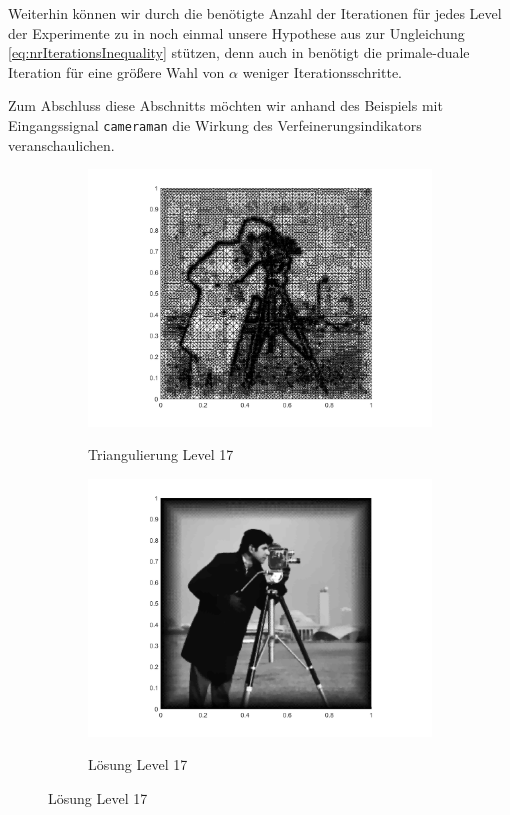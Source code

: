 Weiterhin können wir durch die benötigte Anzahl der Iterationen für jedes Level
der Experimente zu  in
 noch einmal unsere Hypothese aus 
 zur Ungleichung \eqref{eq:nrIterationsInequality}
stützen, denn auch in  benötigt die
primale-duale Iteration für eine größere Wahl von $\alpha$ weniger
Iterationsschritte.

Zum Abschluss diese Abschnitts möchten wir anhand des Beispiels mit
Eingangssignal \texttt{cameraman} die Wirkung des Verfeinerungsindikators
veranschaulichen.
\begin{figure}[p]
  \centering
  \begin{subfigure}[b]{.39\linewidth}
    \centering
    \caption{Triangulierung Level 17}
    \includegraphics[trim = 100 30 80 20, clip, width=\linewidth]
      {pictures/chapExperiments/secGrayscale/cam/adaptive/lvl17/triangulation.png}
    \label{fig:camLvl17Triang}
  \end{subfigure}
  \quad
  \begin{subfigure}[b]{.39\linewidth}
    \centering
    \caption{Lösung Level 17}
    \includegraphics[trim = 100 30 80 20, clip, width=\linewidth]
      {pictures/chapExperiments/secGrayscale/cam/adaptive/lvl17/solutionGrayscale.png}
    \label{fig:camLvl17Sol}
  \end{subfigure}


\end{figure}
